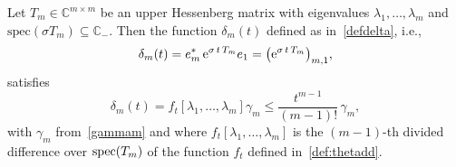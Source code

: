 \documentclass[smallextended]{svjour3pre}%
\numberwithin{equation}{section}
\numberwithin{figure}{section}
\numberwithin{table}{section}
\newcommand{\C}{\mathbb C}%
\newcommand{\divdif}[2]{#2[#1]}
\newcommand{\ee}{{\rm e}}
\newcommand\sca{\sigma}
\begin{document}
\begin{proposition}%
                    \label{prop:prop1}

\noindent
Let $T_m \in \C^{m\times m}$ be an upper Hessenberg matrix with eigenvalues $ \lambda_1,\ldots,\lambda_m $
and $ \text{spec}(\sca T_m) \subseteq \C_- $.
Then the function $ \delta_m(t) $ defined as in~\eqref{defdelta}, i.e.,
\begin{equation*}
\delta_m(t) = e_m^\ast\,\ee^{\sca\,t\,T_m}e_1
            = \big( \ee^{\sca\,t\,T_m} \big)_{m,1},
\end{equation*}
satisfies
\begin{equation}\label{deltam-repr}
\delta_m(t) =
\divdif{\lambda_1,\ldots,\lambda_m}{f_t} \gamma_m
\leq {\frac{t^{m-1}}{(m-1)!}\,\gamma_m,}
\end{equation}
with $ \gamma_m $ from~\eqref{gammam} and
where $\divdif{\lambda_1,\ldots,\lambda_m}{f_t}$ is
the {$ (m-1) $-th} divided difference over
$ \text{\rm spec}(T_m) $
of the function $ f_t $ defined in~\eqref{def:thetadd}.
\end{proposition}
\end{document}
